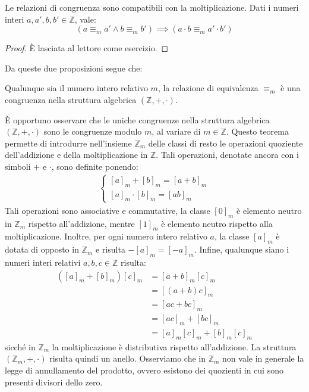 \begin{propbox}
	Le relazioni di congruenza sono compatibili con la moltiplicazione. Dati i numeri interi $a,a',b,b' \in \mathbb{Z}$, vale:
	\begin{equation}
	(a \equiv_{m} a' \land b \equiv_{m} b') 	\implies	(a \cdot b \equiv_{m} a' \cdot b')
	\end{equation}
\end{propbox}

\begin{proof}
	È lasciata al lettore come esercizio.
\end{proof}

Da queste due proposizioni segue che:

\begin{teorbox}
	Qualunque sia il numero intero relativo $m$, la relazione di equivalenza $\equiv_{m}$ è una congruenza nella struttura algebrica $(\mathbb{Z},+,\cdot)$.
\end{teorbox}

È opportuno osservare che le uniche congruenze nella struttura algebrica $(\mathbb{Z},+,\cdot)$ sono le congruenze modulo $m$, al variare di $m \in \mathbb{Z}$. Questo teorema permette di introdurre nell'insieme $\mathbb{Z}_{m}$ delle classi di resto le operazioni quoziente dell'addizione e della moltiplicazione in $\mathbb{Z}$. Tali operazioni, denotate ancora con i simboli $+$ e $\cdot$, sono definite ponendo:
\begin{align*}
\begin{cases}
		[a]_{m}+[b]_{m} = [a+b]_{m}\\
	[a]_{m} \cdot [b]_{m} = [ab]_{m}
\end{cases}
\end{align*}
Tali operazioni sono associative e commutative, la classe $[0]_{m}$ è elemento neutro in $\mathbb{Z}_{m}$ rispetto all'addizione, mentre $[1]_{m}$ è elemento neutro rispetto alla moltiplicazione. Inoltre, per ogni numero intero relativo $a$, la classe $[a]_{m}$ è dotata di opposto in $\mathbb{Z}_{m}$ e risulta $-[a]_{m}=[-a]_{m}$. Infine, qualunque siano i numeri interi relativi $a,b,c \in \mathbb{Z}$ risulta:
\begin{align*}
	([a]_{m}+[b]_{m})[c]_{m} &=[a+b]_{m}[c]_{m} \\
	&=[(a+b)c]_{m}\\
	&=[ac+bc]_{m}\\
	&=[ac]_{m} + [bc]_{m}\\
	&=[a]_{m}[c]_{m} + [b]_{m}[c]_{m}
\end{align*}
sicché in $\mathbb{Z}_{m}$ la moltiplicazione è distributiva rispetto all'addizione. La struttura $(\mathbb{Z}_{m},+,\cdot)$ risulta quindi un anello.
Osserviamo che in $\mathbb{Z}_{m}$ non vale in generale la legge di annullamento del prodotto, ovvero esistono dei quozienti in cui sono presenti divisori dello zero.


